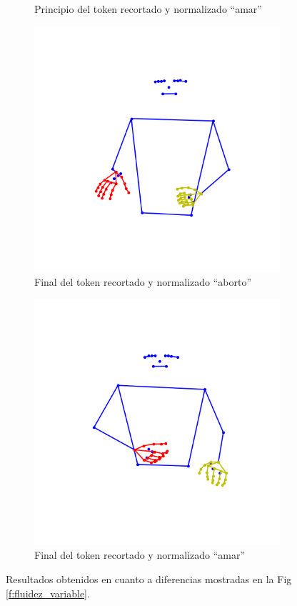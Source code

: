 \begin{figure}[t]
\begin{subfigure}[t]{0.3\textwidth}
		\caption{Principio del token recortado y normalizado ``amar''}
		\label{f:principio_novariable_amar}
	\end{subfigure}	
	\vskip 0pt
	\begin{subfigure}[t]{0.3\textwidth}
		\centering
		\includegraphics[align=t,width=0.9\linewidth, height =0.9\linewidth]{Graphics/cropped_final_aborto.png}
		\caption{Final del token recortado y normalizado ``aborto''}
		\label{f:final_novariable_aborto}
	\end{subfigure}
	\begin{subfigure}[t]{0.3\textwidth}
		\centering
		\includegraphics[align=t,width=0.9\linewidth, height =0.9\linewidth]{Graphics/cropped_final_amar.png}
		\caption{Final del token recortado y normalizado ``amar''}
		\label{f:final_novariable_amar}
	\end{subfigure}
	
	\caption{Resultados obtenidos en cuanto a diferencias mostradas en la Fig \ref{f:fluidez_variable}.}
	\label{f:fluidez_novariable}
\end{figure}

